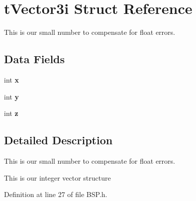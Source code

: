 \hypertarget{structt_vector3i}{}\section{t\+Vector3i Struct Reference}
\label{structt_vector3i}


This is our small number to compensate for float errors.  


\subsection*{Data Fields}
\begin{DoxyCompactItemize}
\item 
int {\bfseries x}\hypertarget{structt_vector3i_a6710576ac3342e96b461fb7b3da3bcd2}{}\label{structt_vector3i_a6710576ac3342e96b461fb7b3da3bcd2}

\item 
int {\bfseries y}\hypertarget{structt_vector3i_aab4da6d92bfc6ec003c7506bb3ea9842}{}\label{structt_vector3i_aab4da6d92bfc6ec003c7506bb3ea9842}

\item 
int {\bfseries z}\hypertarget{structt_vector3i_ac616a6643e5e541676e738f695cbc5a6}{}\label{structt_vector3i_ac616a6643e5e541676e738f695cbc5a6}

\end{DoxyCompactItemize}


\subsection{Detailed Description}
This is our small number to compensate for float errors. 

This is our integer vector structure 

Definition at line 27 of file B\+S\+P.\+h.

